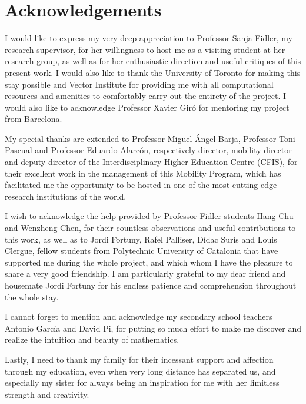 \chapter*{Acknowledgements}

I would like to express my very deep appreciation to Professor Sanja Fidler, my
research supervisor, for her willingness to host me as a visiting student at her
research group, as well as for her enthusiastic direction and useful critiques
of this present work. I would also like to thank the University of Toronto for
making this stay possible and Vector Institute for providing me with all
computational resources and amenities to comfortably carry out the entirety of
the project. I would also like to acknowledge Professor Xavier Giró for
mentoring my project from Barcelona.

My special thanks are extended to Professor Miguel Ángel Barja, Professor Toni
Pascual and Professor Eduardo Alarcón, respectively director, mobility director
and deputy director of the Interdisciplinary Higher Education Centre (CFIS), for
their excellent work in the management of this Mobility Program, which has
facilitated me the opportunity to be hosted in one of the most cutting-edge
research institutions of the world.

I wish to acknowledge the help provided by Professor Fidler students Hang Chu
and Wenzheng Chen, for their countless observations and useful contributions to
this work, as well as to Jordi Fortuny, Rafel Palliser, Dídac Surís and Louis
Clergue, fellow students from Polytechnic University of Catalonia that have
supported me during the whole project, and which whom I have the pleasure to
share a very good friendship. I am particularly grateful to my dear friend and
housemate Jordi Fortuny for his endless patience and comprehension throughout
the whole stay.

I cannot forget to mention and acknowledge my secondary school teachers Antonio
García and David Pi, for putting so much effort to make me discover and realize
the intuition and beauty of mathematics.

Lastly, I need to thank my family for their incessant support and affection
through my education, even when very long distance has separated us, and
especially my sister for always being an inspiration for me with her limitless
strength and creativity.


\tableofcontents
\listoftables
\listoffigures
